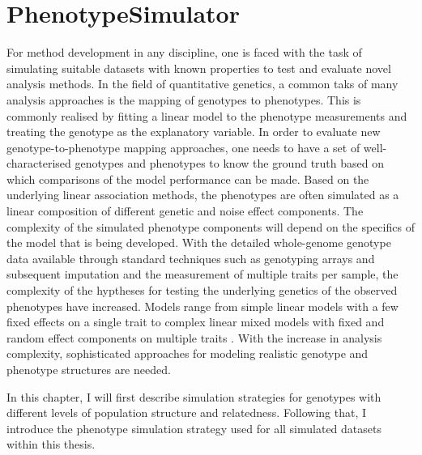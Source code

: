 \chapter{PhenotypeSimulator}
\label{chapter:simulation} 
For method development in any discipline, one is faced with the task of simulating suitable datasets with known properties to test and evaluate novel analysis  methods. In the field of quantitative genetics, a common taks of many analysis approaches is the mapping of genotypes to phenotypes. This is commonly realised by fitting a linear model to the phenotype measurements and treating the genotype as the explanatory variable.  In order to evaluate new genotype-to-phenotype mapping approaches, one needs to have a set of well-characterised genotypes and phenotypes to know the ground truth based on which comparisons of the model performance can be made. Based on the underlying linear association methods, the phenotypes are often simulated as a linear composition of different genetic and noise effect components. The complexity of the simulated phenotype components will depend on the specifics of the model that is being developed. With the detailed whole-genome genotype data available through standard techniques such as genotyping arrays and subsequent imputation and the measurement of multiple traits per sample, the complexity of the hyptheses for testing the underlying genetics of the observed phenotypes have increased. Models range from simple linear models with a few fixed effects on a single trait to complex linear mixed models with fixed and random effect components on multiple traits \citep{Stephens2013,Marigorta2014,Zhou2014,Loh2014}. With the increase in analysis complexity, sophisticated approaches for modeling realistic genotype and phenotype structures are needed.

In this chapter, I will first describe simulation strategies for genotypes with different levels of population structure and relatedness. Following that, I introduce the phenotype simulation strategy used for all simulated datasets within this thesis.

